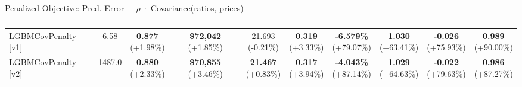 \documentclass[aspectratio=169,10pt]{beamer}
\begin{document}
\begin{frame}{\frameF}
\begin{block}{{\color{blue}Penalized Objective:} Pred. Error + $\rho\; \cdot$  Covariance(ratios, prices)}
\begin{table}[]
{\begin{tabular}{lc|cc|cc|cccc}
LGBMCovPenalty [v1] & 6.58 &
\makecell{\textbf{0.877}\\{\scriptsize(\textcolor{green!60!black}{+1.98\%})}} &
\makecell{\textbf{\$72,042}\\{\scriptsize(\textcolor{green!60!black}{+1.85\%})}} &
\makecell{21.693\\{\scriptsize(\textcolor{red!70!black}{-0.21\%})}} &
\makecell{\textbf{0.319}\\{\scriptsize(\textcolor{green!60!black}{+3.33\%})}} &
\makecell{\textbf{-6.579\%}\\{\scriptsize(\textcolor{green!60!black}{+79.07\%})}} &
\makecell{\textbf{1.030}\\{\scriptsize(\textcolor{green!60!black}{+63.41\%})}} &
\makecell{\textbf{-0.026}\\{\scriptsize(\textcolor{green!60!black}{+75.93\%})}} &
\makecell{\textbf{0.989}\\{\scriptsize(\textcolor{green!60!black}{+90.00\%})}} \\
[1.5mm]

LGBMCovPenalty [v2] & 1487.0 &
\makecell{\textbf{0.880}\\{\scriptsize(\textcolor{green!60!black}{+2.33\%})}} &
\makecell{\textbf{\$70,855}\\{\scriptsize(\textcolor{green!60!black}{+3.46\%})}} &
\makecell{\textbf{21.467}\\{\scriptsize(\textcolor{green!60!black}{+0.83\%})}} &
\makecell{\textbf{0.317}\\{\scriptsize(\textcolor{green!60!black}{+3.94\%})}} &
\makecell{\textbf{-4.043\%}\\{\scriptsize(\textcolor{green!60!black}{+87.14\%})}} &
\makecell{\textbf{1.029}\\{\scriptsize(\textcolor{green!60!black}{+64.63\%})}} &
\makecell{\textbf{-0.022}\\{\scriptsize(\textcolor{green!60!black}{+79.63\%})}} &
\makecell{\textbf{0.986}\\{\scriptsize(\textcolor{green!60!black}{+87.27\%})}} \\
\bottomrule
\end{tabular}
}
\vspace{-1mm}
\caption{\captionF}
\vspace{-5mm}
\end{table}
\end{block}


\end{frame}


\end{document}
